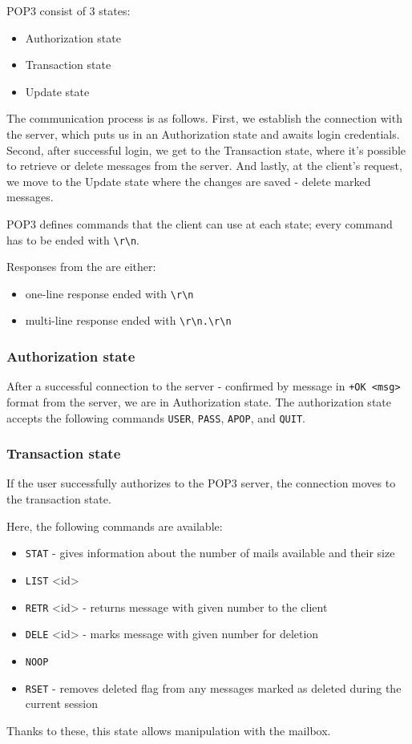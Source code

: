 \documentclass{article}
\begin{document}
\par
POP3 consist of 3 states:
\begin{itemize}
    \item Authorization state
    \item Transaction state
    \item Update state
\end{itemize}
\par
The communication process is as follows. First, we establish the connection with the server, which puts us in an Authorization state and awaits login credentials. Second, after successful login, we get to the Transaction state, where it's possible to retrieve or delete messages from the server. And lastly, at the client's request, we move to the Update state where the changes are saved - delete marked messages.
\par
POP3 defines commands that the client can use at each state; every command has to be ended with \verb|\r\n|.


\par
Responses from the are either:
\begin{itemize}
    \item one-line response ended with \verb|\r\n|
    \item multi-line response ended with \verb|\r\n.\r\n|
\end{itemize}


\subsubsection{Authorization state}
\par
After a successful connection to the server - confirmed by message in \verb|+OK <msg>| format from the server, we are in Authorization state.
The authorization state accepts the following commands \verb|USER|, \verb|PASS|, \verb|APOP|, and \verb|QUIT|.
\subsubsection{Transaction state}
\par
If the user successfully authorizes to the POP3 server, the connection moves to the transaction state. 


\par
Here, the following commands are available:
\begin{itemize}
    \item \verb|STAT| - gives information about the number of mails available and their size
    \item \verb|LIST| <id>
    \item \verb|RETR| <id> - returns message with given number to the client
    \item \verb|DELE| <id> - marks message with given number for deletion
    \item \verb|NOOP|
    \item \verb|RSET| - removes deleted flag from any messages marked as deleted during the current session
\end{itemize}
Thanks to these, this state allows manipulation with the mailbox.
\end{document}
